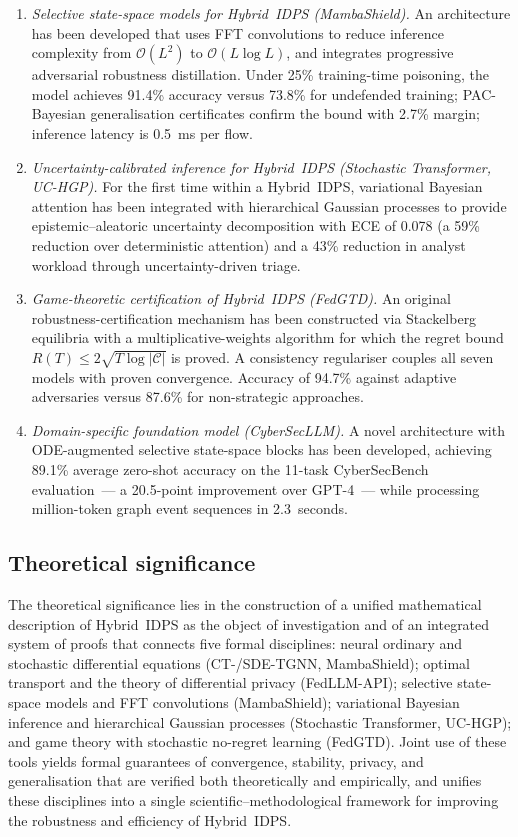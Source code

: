 \documentclass[12pt,a5paper]{article}
\begin{document}
\begin{enumerate}
\item \textit{Selective state-space models for Hybrid~IDPS
(MambaShield).} An architecture has been developed that uses
FFT convolutions to reduce inference complexity from
$\mathcal{O}(L^{2})$ to $\mathcal{O}(L\log L)$, and integrates
progressive adversarial robustness distillation. Under 25\%
training-time poisoning, the model achieves 91.4\% accuracy
versus 73.8\% for undefended training; PAC-Bayesian
generalisation certificates confirm the bound with 2.7\%
margin; inference latency is 0.5~ms per flow.

\item \textit{Uncertainty-calibrated inference for Hybrid~IDPS
(Stochastic Transformer, UC-HGP).} For the first time within
a Hybrid~IDPS, variational Bayesian attention has been
integrated with hierarchical Gaussian processes to provide
epistemic--aleatoric uncertainty decomposition with ECE of
0.078 (a 59\% reduction over deterministic attention) and a
43\% reduction in analyst workload through uncertainty-driven
triage.

\item \textit{Game-theoretic certification of Hybrid~IDPS
(FedGTD).} An original robustness-certification mechanism has
been constructed via Stackelberg equilibria with a
multiplicative-weights algorithm for which the regret bound
$R(T)\le 2\sqrt{T\log|\mathcal{C}|}$ is proved. A consistency
regulariser couples all seven models with proven convergence.
Accuracy of 94.7\% against adaptive adversaries versus 87.6\%
for non-strategic approaches.

\item \textit{Domain-specific foundation model (CyberSecLLM).}
A novel architecture with ODE-augmented selective state-space
blocks has been developed, achieving 89.1\% average zero-shot
accuracy on the 11-task CyberSecBench evaluation~--- a
20.5-point improvement over GPT-4~--- while processing
million-token graph event sequences in 2.3~seconds.
\end{enumerate}

\subsection*{Theoretical significance}

The theoretical significance lies in the construction of a
unified mathematical description of Hybrid~IDPS as the object
of investigation and of an integrated system of proofs that
connects five formal disciplines: neural ordinary and
stochastic differential equations (CT-/SDE-TGNN, MambaShield);
optimal transport and the theory of differential privacy
(FedLLM-API); selective state-space models and FFT
convolutions (MambaShield); variational Bayesian inference
and hierarchical Gaussian processes (Stochastic Transformer,
UC-HGP); and game theory with stochastic no-regret learning
(FedGTD). Joint use of these tools yields formal guarantees of
convergence, stability, privacy, and generalisation that are
verified both theoretically and empirically, and unifies these
disciplines into a single scientific--methodological framework
for improving the robustness and efficiency of Hybrid~IDPS.
\end{document}
